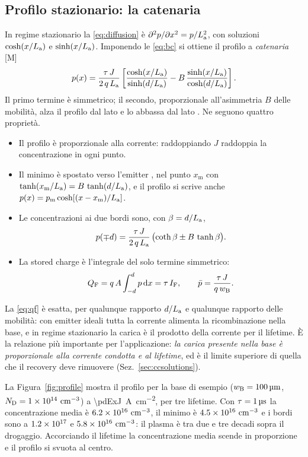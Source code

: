 \documentclass[10pt,a4paper]{scrartcl}
\let\newcommand\pdvaluedefine
\newcommand{\IF}{I_\mathrm{F}}
\newcommand{\diff}{\mathrm{d}}
\newcommand{\ND}{N_\mathrm{D}}
\newcommand{\wB}{w_\mathrm{B}}
\newcommand{\La}{L_\mathrm{a}}
\newcommand{\QF}{Q_\mathrm{F}}
\newcommand{\Pp}{p\textsuperscript{+}}
\newcommand{\Np}{n\textsuperscript{+}}
\newcommand{\cmc}{\si{\centi\metre^{-3}}}
\begin{document}
\subsection{Profilo stazionario: la catenaria}
\label{sec:catenary}
In regime stazionario la \eqref{eq:diffusion} è $\partial^2 p/\partial x^2 = p/\La^2$, con soluzioni $\cosh(x/\La)$ e $\sinh(x/\La)$. Imponendo le \eqref{eq:bc} si ottiene il profilo a \emph{catenaria} [M] \cite{hall1952,baliga}
\begin{equation}
p(x) = \frac{\tau\,J}{2\,q\,\La}\left[\frac{\cosh(x/\La)}{\sinh(d/\La)} - B\,\frac{\sinh(x/\La)}{\cosh(d/\La)}\right] .
\label{eq:catenary}
\end{equation}
Il primo termine è simmetrico; il secondo, proporzionale all'asimmetria $B$ delle mobilità, alza il profilo dal lato \Pp{} e lo abbassa dal lato \Np. Ne seguono quattro proprietà.
\begin{itemize}
\item Il profilo è proporzionale alla corrente: raddoppiando $J$ raddoppia la concentrazione in ogni punto.
\item Il minimo è spostato verso l'emitter \Np, nel punto $x_\mathrm{m}$ con $\tanh(x_\mathrm{m}/\La) = B\,\tanh(d/\La)$, e il profilo si scrive anche $p(x) = p_\mathrm{m}\cosh[(x - x_\mathrm{m})/\La]$.
\item Le concentrazioni ai due bordi sono, con $\beta = d/\La$,
\begin{equation}
p(\mp d) = \frac{\tau\,J}{2\,q\,\La}\,\bigl(\coth\beta \pm B\,\tanh\beta\bigr) .
\label{eq:edges}
\end{equation}
\item La stored charge è l'integrale del solo termine simmetrico:
\begin{equation}
\QF = q\,A\int_{-d}^{d} p\,\diff x = \tau\,\IF , \qquad \bar p = \frac{\tau\,J}{q\,\wB} .
\label{eq:qf}
\end{equation}
\end{itemize}
La \eqref{eq:qf} è esatta, per qualunque rapporto $d/\La$ e qualunque rapporto delle mobilità: con emitter ideali tutta la corrente alimenta la ricombinazione nella base, e in regime stazionario la carica è il prodotto della corrente per il lifetime. È la relazione più importante per l'applicazione: \emph{la carica presente nella base è proporzionale alla corrente condotta e al lifetime}, ed è il limite superiore di quella che il recovery deve rimuovere (Sez.~\ref{sec:ccsolutions}).

La Figura~\ref{fig:profile} mostra il profilo per la base di esempio ($\wB = \SI{\pdExW}{\micro\metre}$, $\ND = \pdExNd\ \cmc$) a \SI{\pdExJ}{\ampere\per\centi\metre\squared}, per tre lifetime. Con $\tau = \SI{1}{\micro\second}$ la concentrazione media è $\pdExMidPbar\ \cmc$, il minimo è $\pdExMidPmin\ \cmc$ e i bordi sono a $1.2\times10^{17}$ e $\pdExMidPr\ \cmc$: il plasma è tra due e tre decadi sopra il drogaggio. Accorciando il lifetime la concentrazione media scende in proporzione e il profilo si svuota al centro.
\end{document}
